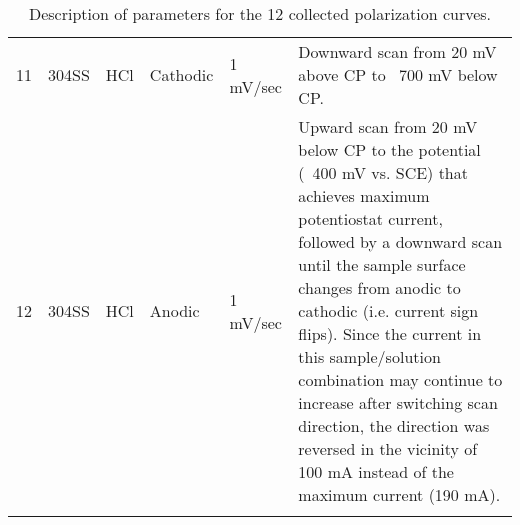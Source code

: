 \begin{longtable}{lccp{2.5cm}p{2.5cm}p{6cm}}
	11 & 304SS & HCl & Cathodic & 1 mV/sec & Downward scan from 20 mV above CP to ~700 mV below CP. \\
	12 & 304SS & HCl & Anodic & 1 mV/sec & Upward scan from 20 mV below CP to the potential (~400 mV vs. SCE) that achieves maximum potentiostat current, followed by a downward scan until the sample surface changes from anodic to cathodic (i.e. current sign flips).  Since the current in this sample/solution combination may continue to increase after switching scan direction, the direction was reversed in the vicinity of 100 mA instead of the maximum current (190 mA). \\
	\bottomrule
	\caption{Description of parameters for the 12 collected polarization curves.}
	\label{table:sweeps_full}
\end{longtable}
\doublespacing
